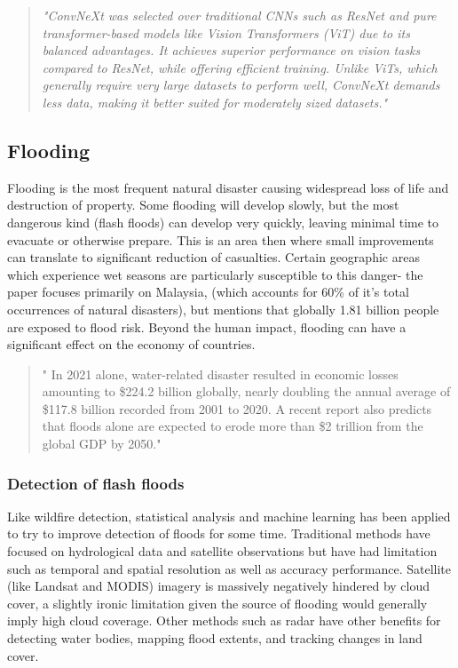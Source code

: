 \documentclass[conference,a4paper]{IEEEtran}
\begin{document}
\begin{quote}
\textit{"ConvNeXt was selected over traditional CNNs such as ResNet and pure transformer-based models like Vision Transformers (ViT) due to its balanced advantages. It achieves superior performance on vision tasks compared to ResNet, while offering efficient training. Unlike ViTs, which generally require very large datasets to perform well, ConvNeXt demands less data, making it better suited for moderately sized datasets."}
\end{quote}
\cite{elbohy2025fusion}


\subsection{Flooding}

Flooding is the most frequent natural disaster causing widespread loss of life and destruction of property. Some flooding will develop slowly, but the most dangerous kind (flash floods) can develop very quickly, leaving minimal time to evacuate or otherwise prepare. This is an area then where small improvements can translate to significant reduction of casualties. Certain geographic areas which experience wet seasons are particularly susceptible to this danger- the paper focuses primarily on Malaysia, (which accounts for 60\% of it's total occurrences of natural disasters), but mentions that globally 1.81 billion people are exposed to flood risk. Beyond the human impact, flooding can have a significant effect on the economy of countries.

\begin{quote}
    " In 2021 alone, water-related disaster resulted in economic losses amounting to \$224.2 billion  globally, nearly doubling the annual average of \$117.8 billion recorded from 2001 to 2020. A recent report also predicts that floods alone are expected to erode more than \$2 trillion from the global GDP by 2050."
\end{quote}

\subsubsection{Detection of flash floods}

Like wildfire detection, statistical analysis and machine learning has been applied to try to improve detection of floods for some time. Traditional methods have focused on hydrological data and satellite observations but have had limitation such as temporal and spatial resolution as well as accuracy performance. Satellite (like Landsat and MODIS) imagery is massively negatively hindered by cloud cover, a slightly ironic limitation given the source of flooding would generally imply high cloud coverage. Other methods such as radar have other benefits for detecting water bodies, mapping flood extents, and tracking changes in land cover.
\end{document}
